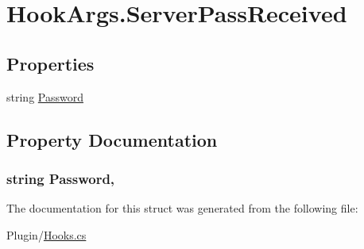 \hypertarget{structOTA_1_1Plugin_1_1HookArgs_1_1ServerPassReceived}{}\section{Hook\+Args.\+Server\+Pass\+Received}
\label{structOTA_1_1Plugin_1_1HookArgs_1_1ServerPassReceived}
\subsection*{Properties}
\begin{DoxyCompactItemize}
\item 
string \hyperlink{structOTA_1_1Plugin_1_1HookArgs_1_1ServerPassReceived_a9c7aae3a8518d5efd22e991b5944e0d4}{Password}
\end{DoxyCompactItemize}


\subsection{Property Documentation}
\hypertarget{structOTA_1_1Plugin_1_1HookArgs_1_1ServerPassReceived_a9c7aae3a8518d5efd22e991b5944e0d4}{}
\subsubsection[{Password}]{\setlength{\rightskip}{0pt plus 5cm}string Password\hspace{0.3cm}{\ttfamily [get]}, {\ttfamily [set]}}\label{structOTA_1_1Plugin_1_1HookArgs_1_1ServerPassReceived_a9c7aae3a8518d5efd22e991b5944e0d4}


The documentation for this struct was generated from the following file\+:\begin{DoxyCompactItemize}
\item 
Plugin/\hyperlink{Hooks_8cs}{Hooks.\+cs}\end{DoxyCompactItemize}
